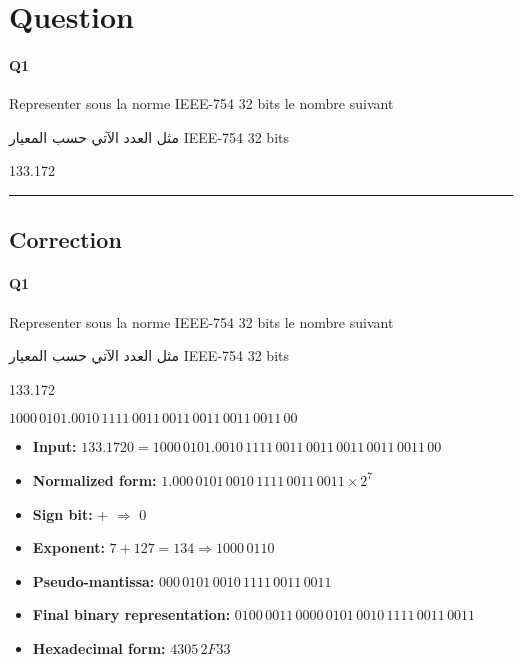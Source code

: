 
\section{Question}


\paragraph{Q1}

Representer sous la norme IEEE-754 32 bits le nombre suivant

\begin{arab}[utf]
مثل العدد الآتي حسب المعيار IEEE-754 32 bits
\end{arab}

133.172



\hrule width 1\linewidth
\pagebreak

\subsection{Correction}


\paragraph{Q1}

Representer sous la norme IEEE-754 32 bits le nombre suivant

\begin{arab}[utf]
مثل العدد الآتي حسب المعيار IEEE-754 32 bits
\end{arab}

133.172

$1000\,0101.0010\,1111\,0011\,0011\,0011\,0011\,0011\,00$

\begin{itemize}
  \item \textbf{Input:} $133.1720 =  1000\,0101.0010\,1111\,0011\,0011\,0011\,0011\,0011\,00 $
  \item \textbf{Normalized form:} $1.000\,0101\,0010\,1111\,0011\,0011 \times 2^7$
  \item \textbf{Sign bit:} + $\Rightarrow$ 0
  \item \textbf{Exponent:} $7 + 127 = 134 \Rightarrow 1000\,0110$
  \item \textbf{Pseudo-mantissa:} $000\,0101\,0010\,1111\,0011\,0011$
  \item \textbf{Final binary representation:}  $0100\,0011\,0000\,0101\,0010\,1111\,0011\,0011 $
  \item \textbf{Hexadecimal form:} $ 4305\,2F33 $
  \end{itemize}

